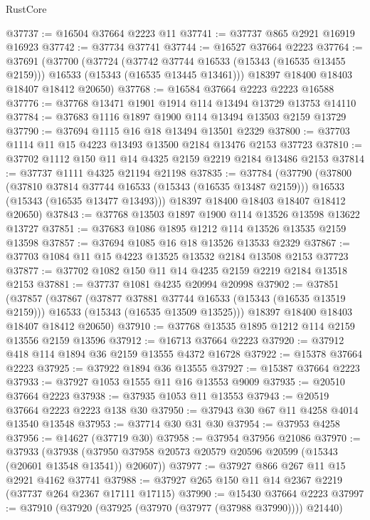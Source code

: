 \begin{lexlean}{RustCore}
\begin{coremodule}
@37737 := @16504 @37664 @2223 @11
@37741 := @37737 @865 @2921 @16919 @16923
@37742 := @37734 @37741
@37744 := @16527 @37664 @2223
@37764 := @37691
    (@37700
      (@37724
        (@37742 @37744 @16533 (@15343 (@16535 @13455 @2159)))
        @16533
        (@15343 (@16535 @13445 @13461)))
      @18397
      @18400
      @18403
      @18407
      @18412
      @20650)
@37768 := @16584 @37664 @2223 @2223 @16588
@37776 := @37768 @13471 @1901 @1914 @114 @13494 @13729 @13753 @14110
@37784 := @37683 @1116 @1897 @1900 @114 @13494 @13503 @2159 @13729
@37790 := @37694 @1115 @16 @18 @13494 @13501 @2329
@37800 := @37703 @1114 @11 @15 @4223 @13493 @13500 @2184 @13476 @2153 @37723
@37810 := @37702 @1112 @150 @11 @14 @4325 @2159 @2219 @2184 @13486 @2153
@37814 := @37737 @1111 @4325 @21194 @21198
@37835 := @37784
    (@37790
      (@37800
        (@37810 @37814 @37744 @16533 (@15343 (@16535 @13487 @2159)))
        @16533
        (@15343 (@16535 @13477 @13493)))
      @18397
      @18400
      @18403
      @18407
      @18412
      @20650)
@37843 := @37768 @13503 @1897 @1900 @114 @13526 @13598 @13622 @13727
@37851 := @37683 @1086 @1895 @1212 @114 @13526 @13535 @2159 @13598
@37857 := @37694 @1085 @16 @18 @13526 @13533 @2329
@37867 := @37703 @1084 @11 @15 @4223 @13525 @13532 @2184 @13508 @2153 @37723
@37877 := @37702 @1082 @150 @11 @14 @4235 @2159 @2219 @2184 @13518 @2153
@37881 := @37737 @1081 @4235 @20994 @20998
@37902 := @37851
    (@37857
      (@37867
        (@37877 @37881 @37744 @16533 (@15343 (@16535 @13519 @2159)))
        @16533
        (@15343 (@16535 @13509 @13525)))
      @18397
      @18400
      @18403
      @18407
      @18412
      @20650)
@37910 := @37768 @13535 @1895 @1212 @114 @2159 @13556 @2159 @13596
@37912 := @16713 @37664 @2223
@37920 := @37912 @418 @114 @1894 @36 @2159 @13555 @4372 @16728
@37922 := @15378 @37664 @2223
@37925 := @37922 @1894 @36 @13555
@37927 := @15387 @37664 @2223
@37933 := @37927 @1053 @1555 @11 @16 @13553 @9009
@37935 := @20510 @37664 @2223
@37938 := @37935 @1053 @11 @13553
@37943 := @20519 @37664 @2223 @2223 @138 @30
@37950 := @37943 @30 @67 @11 @4258 @4014 @13540 @13548
@37953 := @37714 @30 @31 @30
@37954 := @37953 @4258
@37956 := @14627 (@37719 @30)
@37958 := @37954 @37956 @21086
@37970 := @37933
    (@37938 (@37950 @37958 @20573 @20579 @20596 @20599 (@15343 (@20601 @13548 @13541)) @20607))
@37977 := @37927 @866 @267 @11 @15 @2921 @4162 @37741
@37988 := @37927 @265 @150 @11 @14 @2367 @2219 (@37737 @264 @2367 @17111 @17115)
@37990 := @15430 @37664 @2223
@37997 := @37910 (@37920 (@37925 (@37970 (@37977 (@37988 @37990)))) @21440)

\end{coremodule}
\end{lexlean}
